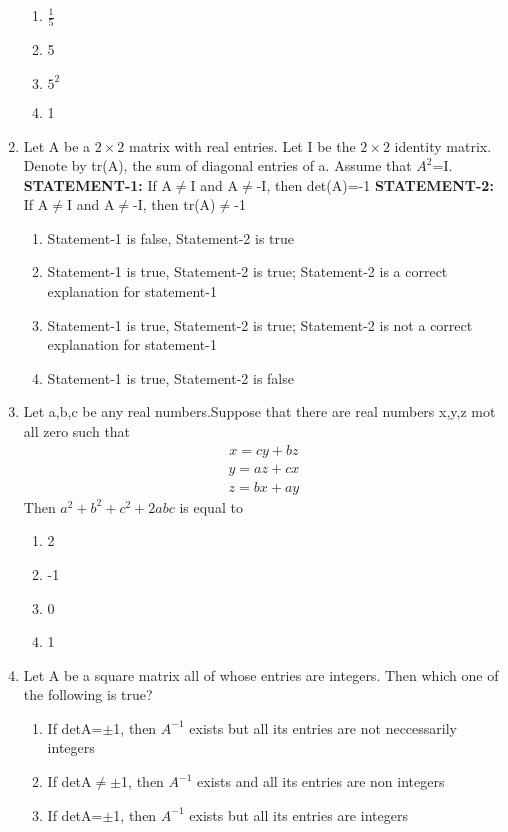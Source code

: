 \begin{enumerate}
\begin{enumerate}
 \item $\frac{1}{5}$
 \item 5
 \item $5^2$
 \item 1
\end{enumerate}
\item Let A be a $2\times 2$ matrix with real entries. Let I be the $2\times2$ identity matrix. Denote by tr(A), the sum of diagonal entries of a. Assume that $A^2$=I.
\textbf {STATEMENT-1:} If A$\neq$I and A$\neq$-I, then det(A)=-1 
\textbf {STATEMENT-2:} If A$\neq$I and A$\neq$-I, then tr(A)$\neq$-1
\begin{enumerate}
 \item Statement-1 is false, Statement-2 is true
 \item Statement-1 is true, Statement-2 is true; Statement-2 is a correct explanation for statement-1
 \item Statement-1 is true, Statement-2 is true; Statement-2 is not a correct explanation for statement-1
 \item Statement-1 is true, Statement-2 is false
\end{enumerate}
\item Let a,b,c be any real numbers.Suppose that there are real numbers x,y,z mot all zero such that \begin{align} x = cy + bz\end{align}  \begin{align} y = az + cx \end{align}  \begin{align} z = bx + ay \end{align} Then $a^2+b^2+c^2+2abc$ is equal to
\begin{enumerate}
 \item 2
 \item -1
 \item 0
 \item 1
\end{enumerate}
\item Let A be a square matrix all of whose entries are integers. Then which one of the following is true?
\begin{enumerate}
 \item If detA=$\pm$1, then $A^{-1}$ exists but all its entries are not neccessarily integers
 \item If detA$\neq$$\pm$1, then $A^{-1}$ exists and  all its entries are non  integers
 \item If detA=$\pm$1, then $A^{-1}$ exists but all its entries are integers
$$
\end{enumerate}
\end{enumerate}
